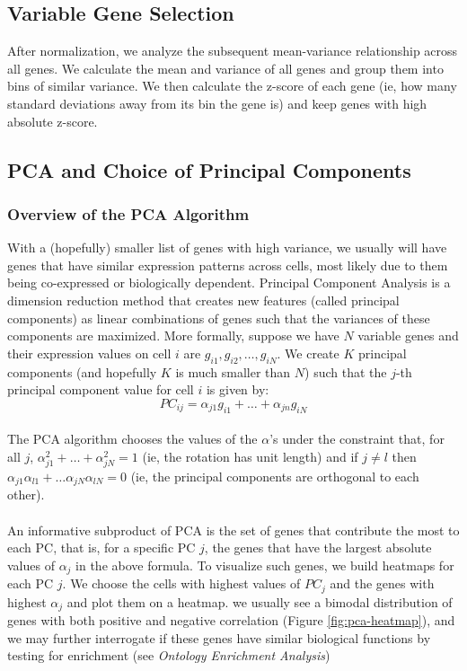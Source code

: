 \subsection{Variable Gene Selection}
After normalization, we analyze the subsequent mean-variance relationship across all genes. We calculate the mean and variance of all genes and group them into bins of similar variance. We then calculate the z-score of each gene (ie, how many standard deviations away from its bin the gene is) and keep genes with high absolute z-score. 

\newpage
\subsection{PCA and Choice of Principal Components}
\subsubsection{Overview of the PCA Algorithm}
With a (hopefully) smaller list of genes with high variance, we usually will have genes that have similar expression patterns across cells, most likely due to them being co-expressed or biologically dependent. Principal Component Analysis is a dimension reduction method that creates new features (called principal components) as linear combinations of genes such that the variances of these components are maximized. More formally, suppose we have $N$ variable genes and their expression values on cell $i$ are $g_{i1}, g_{i2}, \dots, g_{iN}$. We create $K$ principal components (and hopefully $K$ is much smaller than $N$) such that the $j$-th principal component value for cell $i$ is given by:
$$
PC_{ij} = \alpha_{j1} g_{i1} + \dots + \alpha_{jn} g_{iN}
$$
\\
The PCA algorithm chooses the values of the $\alpha$'s under the constraint that, for all $j$, $\alpha_{j1}^2 + \dots + \alpha_{jN}^2 = 1$ (ie, the rotation has unit length) and if $j \neq l$ then $\alpha_{j1}\alpha_{l1} + \dots \alpha_{jN}\alpha_{lN} = 0$ (ie, the principal components are orthogonal to each other). \\
\\
An informative subproduct of PCA is the set of genes that contribute the most to each PC, that is, for a specific PC $j$, the genes that have the largest absolute values of $\alpha_j$ in the above formula. To visualize such genes, we build heatmaps for each PC $j$. We choose the cells with highest values of $PC_j$ and the genes with highest $\alpha_j$ and plot them on a heatmap. we usually see a bimodal distribution of genes with both positive and negative correlation (Figure  \ref{fig:pca-heatmap}), and we may further interrogate if these genes have similar biological functions by testing for enrichment (see \emph{Ontology Enrichment Analysis})

